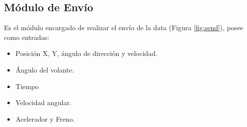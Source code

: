 \subsection{Módulo de Envío}
Es el módulo encargado de realizar el envío de la data (Figura \ref{fig:send}), posee como entradas:
\begin{itemize}
\item Posición X, Y, ángulo de dirección y velocidad.
\item Ángulo del volante.
\item Tiempo
\item Velocidad angular.
\item Acelerador y Freno.
\end{itemize}

\begin{figure}[!h]
 \centering
  \\

\end{figure}
